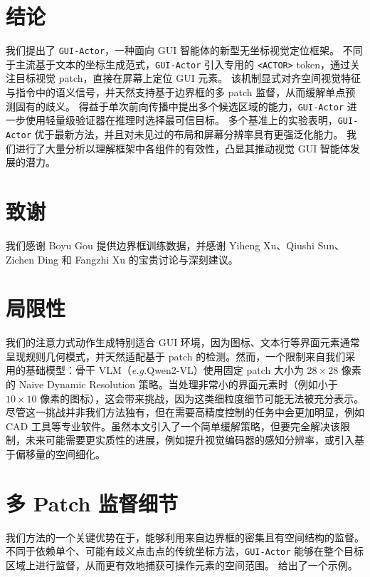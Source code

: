 \documentclass{article}
\newcommand{\eg}{\textit{e.g.}}
\newcommand{\sys}{\texttt{GUI-Actor}\xspace}
\begin{document}
\section{结论}
我们提出了 \sys，一种面向 GUI 智能体的新型无坐标视觉定位框架。
不同于主流基于文本的坐标生成范式，\sys 引入专用的 \texttt{<ACTOR>} token，通过关注目标视觉 patch，直接在屏幕上定位 GUI 元素。
该机制显式对齐空间视觉特征与指令中的语义信号，并天然支持基于边界框的多 patch 监督，从而缓解单点预测固有的歧义。
得益于单次前向传播中提出多个候选区域的能力，\sys 进一步使用轻量级验证器在推理时选择最可信目标。
多个基准上的实验表明，\sys 优于最新方法，并且对未见过的布局和屏幕分辨率具有更强泛化能力。
我们进行了大量分析以理解框架中各组件的有效性，凸显其推动视觉 GUI 智能体发展的潜力。

\section*{致谢}
我们感谢 Boyu Gou 提供边界框训练数据，并感谢 Yiheng Xu、Qiushi Sun、Zichen Ding 和 Fangzhi Xu 的宝贵讨论与深刻建议。

{
\small


}

\appendix

\section{局限性}\label{app:limitations}
我们的注意力式动作生成特别适合 GUI 环境，因为图标、文本行等界面元素通常呈现规则几何模式，并天然适配基于 patch 的检测。然而，一个限制来自我们采用的基础模型：骨干 VLM（\eg Qwen2-VL）使用固定 patch 大小为 $28\times28$ 像素的 Naive Dynamic Resolution 策略。当处理非常小的界面元素时（例如小于 $10\times10$ 像素的图标），这会带来挑战，因为这类细粒度细节可能无法被充分表示。尽管这一挑战并非我们方法独有，但在需要高精度控制的任务中会更加明显，例如 CAD 工具等专业软件。虽然本文引入了一个简单缓解策略，但要完全解决该限制，未来可能需要更实质性的进展，例如提升视觉编码器的感知分辨率，或引入基于偏移量的空间细化。

\section{多 Patch 监督细节}
\label{appendix:multi_path_supervision}
我们方法的一个关键优势在于，能够利用来自边界框的密集且有空间结构的监督。不同于依赖单个、可能有歧义点击点的传统坐标方法，\sys 能够在整个目标区域上进行监督，从而更有效地捕获可操作元素的空间范围。 给出了一个示例。
\end{document}
